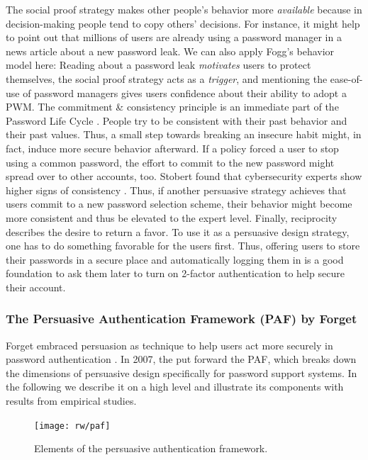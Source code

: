 	The social proof strategy makes other people's behavior more \textit{available} because in decision-making people tend to copy others' decisions. For instance, it might help to point out that millions of users are already using a password manager in a news article about a new password leak. We can also apply Fogg's behavior model here: Reading about a password leak \textit{motivates} users to protect themselves, the social proof strategy acts as a \textit{trigger}, and mentioning the ease-of-use of password managers gives users confidence about their ability to adopt a \gls{PWM}. 
	The commitment \& consistency principle is an immediate part of the Password Life Cycle \cite{Stobert2014PasswordLifeCycle}. People try to be consistent with their past behavior and their past values. Thus, a small step towards breaking an insecure habit might, in fact, induce more secure behavior afterward. If a policy forced a user to stop using a common password, the effort to commit to the new password might spread over to other accounts, too. Stobert found that cybersecurity experts show higher signs of consistency \cite{Stobert2015ExpertPassword}. Thus, if another persuasive strategy achieves that users commit to a new password selection scheme, their behavior might become more consistent and thus be elevated to the expert level. 
	Finally, reciprocity describes the desire to return a favor. To use it as a persuasive design strategy, one has to do something favorable for the users first. Thus, offering users to store their passwords in a secure place and automatically logging them in is a good foundation to ask them later to turn on 2-factor authentication to help secure their account.
	
	\subsubsection{The Persuasive Authentication Framework (PAF) by Forget \etal}
	Forget \etal embraced persuasion as technique to help users act more securely in password authentication \cite{Forget2007PersuasionEducationSecurity}. In 2007, the put forward the \gls{PAF}, which breaks down the dimensions of persuasive design specifically for password support systems. In the following we describe it on a high level and illustrate its components with results from empirical studies. 
	
	\begin{figure}
		\centering
		\texttt{[image: rw/paf]}
		\caption{\label{fig:rw:paf} Elements of the persuasive authentication framework.}
	\end{figure}

